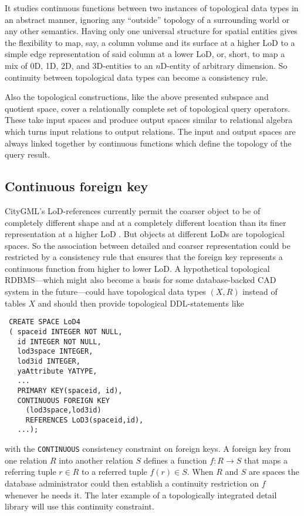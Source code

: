 \documentclass[5p]{elsarticle}
\newcommand{\qq}[1]{``#1''}
\begin{document}
It studies continuous functions between two instances of topological 
data types in an abstract manner, ignoring any \qq{outside} topology of a surrounding world or 
any other semantics. 
Having only one universal structure for spatial entities gives the flexibility to map, say, a 
column volume and its surface at a higher LoD to a simple edge representation of 
said column at a lower LoD, or, short, to map a mix of 0D, 1D, 2D, and 3D-entities to 
an $n$D-entity of arbitrary dimension. So continuity between topological data types can become 
a consistency rule.   

Also the topological constructions, like the above presented subspace and 
quotient space, cover a relationally complete set of topological query operators. 
These take input spaces and produce output spaces similar to relational algebra 
which turns input relations to output relations. 
The input and output spaces are always linked together by continuous functions which 
define the topology of the query result.  


\subsection{Continuous foreign key}

CityGML's LoD-references currently permit the coarser 
object to be of completely different 
shape and at a completely different location than its finer representation 
at a higher LoD \cite[p.\ 314]{OosteromStoter:5D}. 
But objects at different LoDs are topological spaces. So the association between detailed 
and coarser representation could be restricted by a consistency rule that ensures that the 
foreign key represents a continuous function from higher to lower LoD. 
A hypothetical topological RDBMS---which might also become a basis for some database-backed CAD 
system in the future---could have topological data types $(X,R)$ instead of tables $X$ and 
should then provide topological DDL-statements like 
\begin{verbatim}
 CREATE SPACE LoD4
 ( spaceid INTEGER NOT NULL,
   id INTEGER NOT NULL,
   lod3space INTEGER,
   lod3id INTEGER,
   yaAttribute YATYPE, 
   ...
   PRIMARY KEY(spaceid, id),
   CONTINUOUS FOREIGN KEY
     (lod3space,lod3id) 
     REFERENCES LoD3(spaceid,id),
   ...);
\end{verbatim}
with the \texttt{CONTINUOUS} consistency constraint on foreign keys. 
A foreign key from one relation $R$ into another relation $S$ defines a function $f:R\to S$ 
that maps a referring tuple $r\in R$ to a referred tuple $f(r)\in S$. 
When $R$ and $S$ are spaces the database administrator could then establish a continuity 
restriction on $f$ whenever he needs it. The later example of a topologically integrated 
detail library will use this continuity constraint. 
\end{document}
